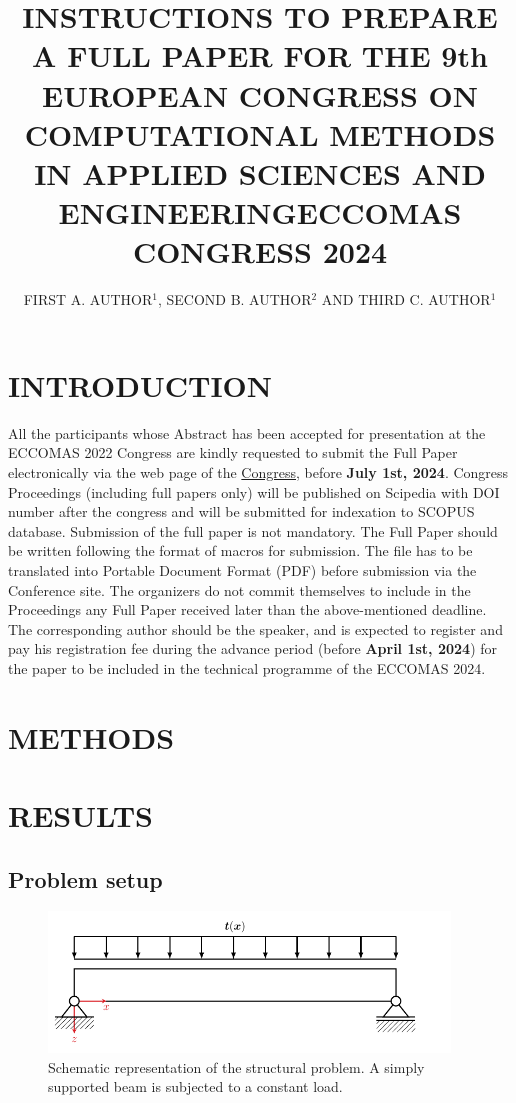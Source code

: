 \documentclass[a4paper]{eccomas_paper-2024}
\title{INSTRUCTIONS TO PREPARE A FULL PAPER FOR THE 9th EUROPEAN CONGRESS ON COMPUTATIONAL METHODS IN APPLIED SCIENCES AND ENGINEERING\break ECCOMAS CONGRESS 2024}
\author{FIRST A. AUTHOR$^1$, SECOND B. AUTHOR$^2$ AND THIRD C. AUTHOR$^1$}
\begin{document}
\thispagestyle{empty}

\section{INTRODUCTION}

All the participants whose Abstract has been accepted for presentation at the ECCOMAS 2022 Congress are kindly requested to submit the Full Paper electronically via the web page of the \href{https://eccomas2024.org/lisbon}{Congress}, before \textbf{July 1st, 2024}. Congress Proceedings (including full papers only) will be published on Scipedia with DOI number after the congress and will be submitted for indexation to SCOPUS database. Submission of the full paper is not mandatory. The Full Paper should be written following the format of macros for submission. The file has to be translated into Portable Document Format (PDF) before submission via the Conference site. The organizers do not commit themselves to include in the Proceedings any Full Paper received later than the above-mentioned deadline. The corresponding author should be the speaker, and is expected to register and pay his registration fee during the advance period (before \textbf{April 1st, 2024}) for the paper to be included in the technical programme of the ECCOMAS 2024.

\section{METHODS}

\section{RESULTS}

\subsection{Problem setup}

\begin{figure}
    \begin{center}
        \includegraphics[width=0.95\textwidth]{./figures/beam/beam_sketch.pdf}
    \end{center}
    \caption{Schematic representation of the structural problem. A simply supported beam is subjected to a constant load.}\label{fig:beam_sketch}
\end{figure}
\end{document}
